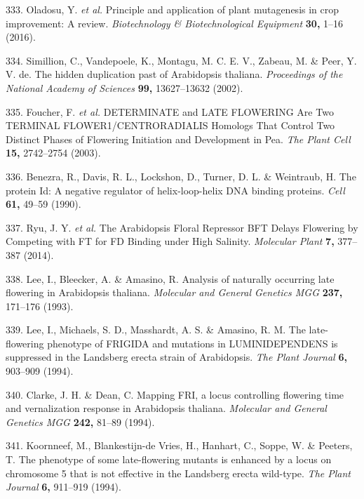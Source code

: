 \documentclass[12pt,]{book}
\begin{document}
\hypertarget{ref-oladosu_principle_2016}{}
333. Oladosu, Y. \emph{et al.} Principle and application of plant
mutagenesis in crop improvement: A review. \emph{Biotechnology \&
Biotechnological Equipment} \textbf{30,} 1--16 (2016).

\hypertarget{ref-simillion_hidden_2002}{}
334. Simillion, C., Vandepoele, K., Montagu, M. C. E. V., Zabeau, M. \&
Peer, Y. V. de. The hidden duplication past of Arabidopsis thaliana.
\emph{Proceedings of the National Academy of Sciences} \textbf{99,}
13627--13632 (2002).

\hypertarget{ref-foucher_determinate_2003}{}
335. Foucher, F. \emph{et al.} DETERMINATE and LATE FLOWERING Are Two
TERMINAL FLOWER1/CENTRORADIALIS Homologs That Control Two Distinct
Phases of Flowering Initiation and Development in Pea. \emph{The Plant
Cell} \textbf{15,} 2742--2754 (2003).

\hypertarget{ref-benezra_protein_1990}{}
336. Benezra, R., Davis, R. L., Lockshon, D., Turner, D. L. \&
Weintraub, H. The protein Id: A negative regulator of helix-loop-helix
DNA binding proteins. \emph{Cell} \textbf{61,} 49--59 (1990).

\hypertarget{ref-ryu_arabidopsis_2014}{}
337. Ryu, J. Y. \emph{et al.} The Arabidopsis Floral Repressor BFT
Delays Flowering by Competing with FT for FD Binding under High
Salinity. \emph{Molecular Plant} \textbf{7,} 377--387 (2014).

\hypertarget{ref-lee_analysis_1993}{}
338. Lee, I., Bleecker, A. \& Amasino, R. Analysis of naturally
occurring late flowering in Arabidopsis thaliana. \emph{Molecular and
General Genetics MGG} \textbf{237,} 171--176 (1993).

\hypertarget{ref-lee_late_flowering_1994}{}
339. Lee, I., Michaels, S. D., Masshardt, A. S. \& Amasino, R. M. The
late-flowering phenotype of FRIGIDA and mutations in LUMINIDEPENDENS is
suppressed in the Landsberg erecta strain of Arabidopsis. \emph{The
Plant Journal} \textbf{6,} 903--909 (1994).

\hypertarget{ref-clarke_mapping_1994}{}
340. Clarke, J. H. \& Dean, C. Mapping FRI, a locus controlling
flowering time and vernalization response in Arabidopsis thaliana.
\emph{Molecular and General Genetics MGG} \textbf{242,} 81--89 (1994).

\hypertarget{ref-koornneef_phenotype_1994}{}
341. Koornneef, M., Blankestijn-de Vries, H., Hanhart, C., Soppe, W. \&
Peeters, T. The phenotype of some late-flowering mutants is enhanced by
a locus on chromosome 5 that is not effective in the Landsberg erecta
wild-type. \emph{The Plant Journal} \textbf{6,} 911--919 (1994).
\end{document}
